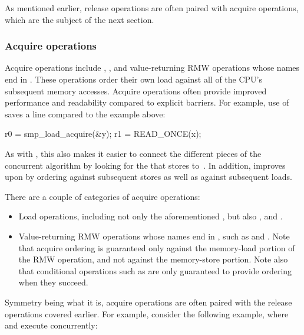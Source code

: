 As mentioned earlier, release operations are often paired with acquire
operations, which are the subject of the next section.


\subsubsection{Acquire operations}

Acquire operations include , ,
and value-returning RMW operations whose names end in .
These operations order their own load against all of the CPU's subsequent
memory accesses.
Acquire operations often provide improved performance and readability
compared to explicit barriers.
For example, use of  saves a line compared to the
 example above:

\begin{VerbatimU}
	r0 = smp_load_acquire(&y);
	r1 = READ_ONCE(x);
\end{VerbatimU}

As with , this also makes it easier to connect
the different pieces of the concurrent algorithm by looking for the
 that stores to~.
In addition,  improves upon  by
ordering against subsequent stores as well as against subsequent loads.

There are a couple of categories of acquire operations:

\begin{itemize}
 \item	Load operations, including not only the aforementioned
	, but also , and
	.

 \item	Value-returning RMW operations whose names end in ,
	such as  and .
	Note that acquire ordering is guaranteed only against the
	memory-load portion of the RMW operation, and not against the
	memory-store portion.
	Note also that conditional operations such as
	 are only guaranteed to provide
	ordering when they succeed.
\end{itemize}

Symmetry being what it is, acquire operations are often paired with the
release operations covered earlier.
For example, consider the following example, where  and
 execute concurrently:

